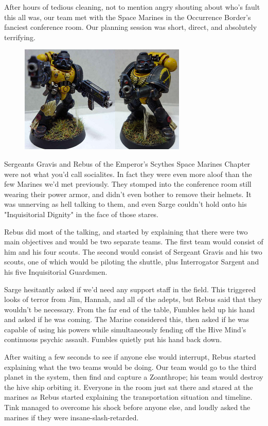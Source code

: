 After hours of tedious cleaning, not to mention angry shouting about who's fault this all was, our team met with the Space Marines in the Occurrence Border's fanciest conference room. 
Our planning session was short, direct, and absolutely terrifying.
\begin{figure}
	\begin{center}
		\includegraphics[width=\figwidth]{pics/12/20.png}
	\end{center}
\end{figure}
Sergeants Gravis and Rebus of the Emperor's Scythes Space Marines Chapter were not what you'd call socialites. 
In fact they were even more aloof than the few Marines we'd met previously. 
They stomped into the conference room still wearing their power armor, and didn't even bother to remove their helmets. 
It was unnerving as hell talking to them, and even Sarge couldn't hold onto his "Inquisitorial Dignity" in the face of those stares. 


Rebus did most of the talking, and started by explaining that there were two main objectives and would be two separate teams. 
The first team would consist of him and his four scouts. 
The second would consist of Sergeant Gravis and his two scouts, one of which would be piloting the shuttle, plus Interrogator Sargent and his five Inquisitorial Guardsmen.

Sarge hesitantly asked if we'd need any support staff in the field. 
This triggered looks of terror from Jim, Hannah, and all of the adepts, but Rebus said that they wouldn't be necessary. 
From the far end of the table, Fumbles held up his hand and asked if he was coming. 
The Marine considered this, then asked if he was capable of using his powers while simultaneously fending off the Hive Mind's continuous psychic assault. 
Fumbles quietly put his hand back down.

After waiting a few seconds to see if anyone else would interrupt, Rebus started explaining what the two teams would be doing. 
Our team would go to the third planet in the system, then find and capture a Zoanthrope; 
his team would destroy the hive ship orbiting it. 
Everyone in the room just sat there and stared at the marines as Rebus started explaining the transportation situation and timeline. 
Tink managed to overcome his shock before anyone else, and loudly asked the marines if they were insane-slash-retarded.

